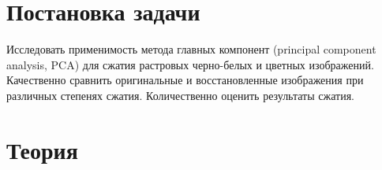 \documentclass[a4paper]{article}
\begin{document}

\tableofcontents
{}
\newpage
\listoffigures
{}
\newpage
\listoftables
{}
\newpage
\section{Постановка задачи}
Исследовать применимость метода главных компонент (principal component analysis, PCA)  для сжатия растровых черно-белых и цветных изображений. Качественно сравнить оригинальные и восстановленные изображения при различных степенях сжатия. Количественно оценить результаты сжатия.
\section{Теория}
\end{document}
